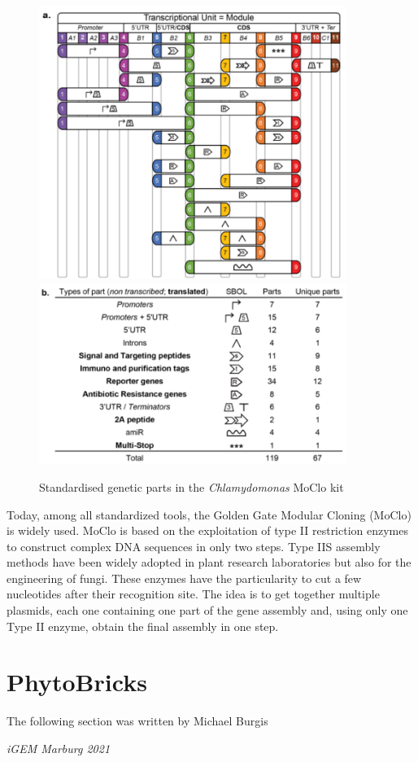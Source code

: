 \begin{figure}[!htpb]
    \centering
{{\includegraphics[width=10cm]{images/chap4/chap4_asm_02.png} }}%
    \qquad
{{\includegraphics[width=10cm]{images/chap4/chap4_asm_03.png} }}%
    \caption{Standardised genetic parts in the \textit{Chlamydomonas} MoClo kit}%
    \label{fig:ch4asm02}%
\end{figure}
\FloatBarrier

\noindent Today, among all standardized tools, the Golden Gate Modular Cloning (MoClo) is widely used. MoClo is based on the exploitation of type II restriction enzymes to construct complex DNA sequences in only two steps. Type IIS assembly methods have been widely adopted in plant research laboratories but also for the engineering of fungi. These enzymes have the particularity to cut a few nucleotides after their recognition site. The idea is to get together multiple plasmids, each one containing one part of the gene assembly and, using only one Type II enzyme, obtain the final assembly in one step. 

\section{PhytoBricks}
\epigraph{The following section was written by Michael Burgis}{\textit{iGEM Marburg 2021}}

